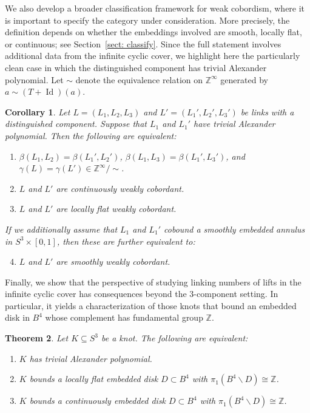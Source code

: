 \documentclass[a4paper, 11pt]{amsart}
\newtheorem{theorem}{Theorem}[section]
\newtheorem{corollary}[theorem]{Corollary}
\theoremstyle{definition}
\newcommand{\Z}{\mathbb{Z}}
\begin{document}
We also develop a broader classification framework for weak cobordism, where it is important to specify the category under consideration. More precisely, the definition depends on whether the embeddings involved are smooth, locally flat, or continuous; see Section~\ref{sect: classify}. Since the full statement involves additional data from the infinite cyclic cover, we highlight here the particularly clean case in which the distinguished component has trivial Alexander polynomial. Let $\sim$ denote the equivalence relation on $\Z^\infty$ generated by
\(
a\sim (T+\operatorname{Id})(a).
\)

\begin{corollary}\label{cor:alexander-one}
Let $L=(L_1,L_2,L_3)$ and $L'=(L_1',L_2',L_3')$ be links with a distinguished component. Suppose that $L_1$ and $L_1'$ have trivial Alexander polynomial. Then the following are equivalent:
\begin{enumerate}
\item \label{item: same invts}
$\beta(L_1,L_2)=\beta(L_1',L_2')$, $\beta(L_1,L_3)=\beta(L_1',L_3')$, and
$\gamma(L)=\gamma(L')\in\Z^\infty /\sim $.

\item \label{item: top weak cob}
$L$ and $L'$ are continuously weakly cobordant.

\item \label{item: LF weak cob}
$L$ and $L'$ are locally flat weakly cobordant.
\end{enumerate}
If we additionally assume that $L_1$ and $L_1'$ cobound a smoothly embedded annulus in $S^3\times[0,1]$, then these are further equivalent to:
\begin{enumerate}\setcounter{enumi}{3}
\item \label{item: smooth weak cob}
$L$ and $L'$ are smoothly weakly cobordant.
\end{enumerate}
\end{corollary}

Finally, we show that the perspective of studying linking numbers of lifts in the infinite cyclic cover has consequences beyond the $3$-component setting. In particular, it yields a characterization of those knots that bound an embedded disk in $B^4$ whose complement has fundamental group $\mathbb{Z}$.

\begin{theorem}\label{thm:pi1-Z-disk}
Let $K\subseteq S^3$ be a knot. The following are equivalent:
\begin{enumerate}
\item \label{item:alexander-one}
$K$ has trivial Alexander polynomial.

\item \label{item:locally-flat-Z-disk}
$K$ bounds a locally flat embedded disk $D\subset B^4$ with
$\pi_1(B^4\smallsetminus D)\cong \Z$.

\item \label{item:continuous-Z-disk}
$K$ bounds a continuously embedded disk $D\subset B^4$ with
$\pi_1(B^4\smallsetminus D)\cong \Z$.
\end{enumerate}
\end{theorem}
\end{document}
